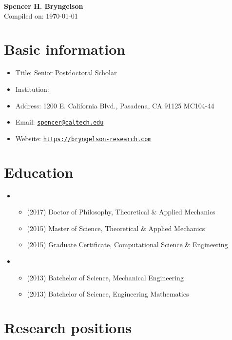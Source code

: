 



\begin{center}
    {\LARGE \bf Spencer H. Bryngelson} \\
    \medskip
    Compiled on: \today
\end{center}

\section{Basic information}
\begin{itemize}
    \item Title: Senior Postdoctoral Scholar
    \item Institution: \CIT
    \item Address: 1200 E. California Blvd., Pasadena, CA 91125 MC104-44
    \item Email: \href{mailto:spencer@caltech.edu}{\texttt{spencer@caltech.edu}}
    \item Website: \href{https://bryngelson-research.com}{\texttt{https://bryngelson-research.com}}
\end{itemize}

\section{Education}

\begin{itemize}
    \item \UIUC
    \begin{itemize}
        \item (2017) Doctor of Philosophy, Theoretical \& Applied Mechanics
        \item (2015) Master of Science, Theoretical \& Applied Mechanics
        \item (2015) Graduate Certificate, Computational Science \& Engineering
    \end{itemize}
    \item \UMD
    \begin{itemize}
        \item (2013) Batchelor of Science, Mechanical Engineering
        \item (2013) Batchelor of Science, Engineering Mathematics
    \end{itemize}
\end{itemize}


\section{Research positions}

